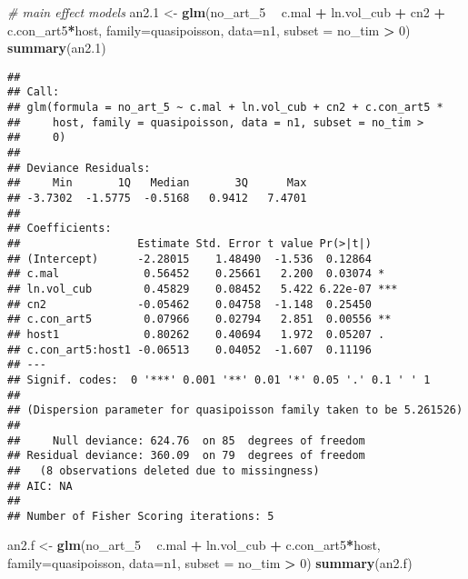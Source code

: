 \documentclass[]{article}
\newenvironment{Shaded}{\begin{snugshade}}{\end{snugshade}}
\newcommand{\KeywordTok}[1]{\textcolor[rgb]{0.13,0.29,0.53}{\textbf{#1}}}
\newcommand{\DataTypeTok}[1]{\textcolor[rgb]{0.13,0.29,0.53}{#1}}
\newcommand{\DecValTok}[1]{\textcolor[rgb]{0.00,0.00,0.81}{#1}}
\newcommand{\StringTok}[1]{\textcolor[rgb]{0.31,0.60,0.02}{#1}}
\newcommand{\CommentTok}[1]{\textcolor[rgb]{0.56,0.35,0.01}{\textit{#1}}}
\newcommand{\OperatorTok}[1]{\textcolor[rgb]{0.81,0.36,0.00}{\textbf{#1}}}
\newcommand{\NormalTok}[1]{#1}
\begin{document}
\begin{Shaded}
\begin{Highlighting}[]
\CommentTok{# main effect models}
\NormalTok{an2.}\DecValTok{1}\NormalTok{ <-}\StringTok{ }\KeywordTok{glm}\NormalTok{(no_art_}\DecValTok{5} \OperatorTok{~}\StringTok{ }\NormalTok{c.mal }\OperatorTok{+}\StringTok{ }\NormalTok{ln.vol_cub }\OperatorTok{+}\StringTok{ }\NormalTok{cn2 }\OperatorTok{+}\StringTok{ }\NormalTok{c.con_art5}\OperatorTok{*}\NormalTok{host,}
           \DataTypeTok{family=}\NormalTok{quasipoisson, }\DataTypeTok{data=}\NormalTok{n1, }\DataTypeTok{subset =}\NormalTok{ no_tim }\OperatorTok{>}\StringTok{ }\DecValTok{0}\NormalTok{)}
\KeywordTok{summary}\NormalTok{(an2.}\DecValTok{1}\NormalTok{)}
\end{Highlighting}
\end{Shaded}

\begin{verbatim}
## 
## Call:
## glm(formula = no_art_5 ~ c.mal + ln.vol_cub + cn2 + c.con_art5 * 
##     host, family = quasipoisson, data = n1, subset = no_tim > 
##     0)
## 
## Deviance Residuals: 
##     Min       1Q   Median       3Q      Max  
## -3.7302  -1.5775  -0.5168   0.9412   7.4701  
## 
## Coefficients:
##                  Estimate Std. Error t value Pr(>|t|)    
## (Intercept)      -2.28015    1.48490  -1.536  0.12864    
## c.mal             0.56452    0.25661   2.200  0.03074 *  
## ln.vol_cub        0.45829    0.08452   5.422 6.22e-07 ***
## cn2              -0.05462    0.04758  -1.148  0.25450    
## c.con_art5        0.07966    0.02794   2.851  0.00556 ** 
## host1             0.80262    0.40694   1.972  0.05207 .  
## c.con_art5:host1 -0.06513    0.04052  -1.607  0.11196    
## ---
## Signif. codes:  0 '***' 0.001 '**' 0.01 '*' 0.05 '.' 0.1 ' ' 1
## 
## (Dispersion parameter for quasipoisson family taken to be 5.261526)
## 
##     Null deviance: 624.76  on 85  degrees of freedom
## Residual deviance: 360.09  on 79  degrees of freedom
##   (8 observations deleted due to missingness)
## AIC: NA
## 
## Number of Fisher Scoring iterations: 5
\end{verbatim}

\begin{Shaded}
\begin{Highlighting}[]
\NormalTok{an2.f <-}\StringTok{ }\KeywordTok{glm}\NormalTok{(no_art_}\DecValTok{5} \OperatorTok{~}\StringTok{ }\NormalTok{c.mal }\OperatorTok{+}\StringTok{ }\NormalTok{ln.vol_cub }\OperatorTok{+}\StringTok{ }\NormalTok{c.con_art5}\OperatorTok{*}\NormalTok{host,}
           \DataTypeTok{family=}\NormalTok{quasipoisson, }\DataTypeTok{data=}\NormalTok{n1, }\DataTypeTok{subset =}\NormalTok{ no_tim }\OperatorTok{>}\StringTok{ }\DecValTok{0}\NormalTok{)}
\KeywordTok{summary}\NormalTok{(an2.f)}
\end{Highlighting}
\end{Shaded}
\end{document}
